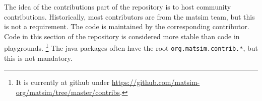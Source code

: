 


The idea of the \glspl{contribution} part of the repository is to host community contributions.
Historically, most contributors are from the \gls{matsim} team, but this is not a requirement.
The code is maintained by the corresponding contributor. 
Code in this section of the repository is considered more stable than code in playgrounds.%
\footnote{
It is currently at \gls{github} under \url{https://github.com/matsim-org/matsim/tree/master/contribs}.  
}
The \gls{java} packages often have the root \lstinline{org.matsim.contrib.*}, but this is not mandatory.

